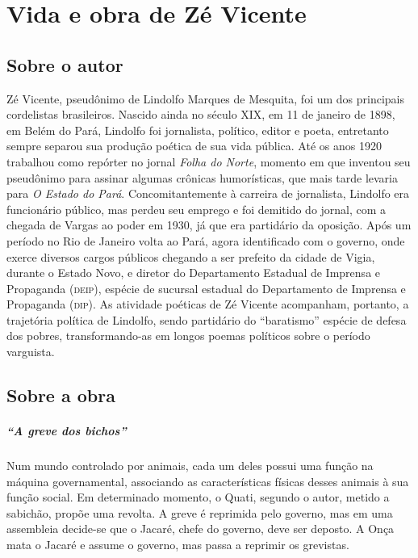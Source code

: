 \chapter{Vida e obra de Zé Vicente}

\section{Sobre o autor}

Zé Vicente, pseudônimo de Lindolfo Marques de Mesquita, foi um dos
principais cordelistas brasileiros. Nascido ainda no século XIX, em 11 de
janeiro de 1898, em Belém do Pará, Lindolfo foi jornalista, político,
editor e poeta, entretanto sempre separou sua produção poética de sua
vida pública. Até os anos 1920 trabalhou como repórter no jornal \textit{Folha
do Norte}, momento em que inventou seu pseudônimo para assinar algumas
crônicas humorísticas, que mais tarde levaria para \textit{O Estado do Pará}.
Concomitantemente à carreira de jornalista, Lindolfo era funcionário
público, mas perdeu seu emprego e foi demitido do jornal, com a chegada
de Vargas ao poder em 1930, já que era partidário da oposição. Após um
período no Rio de Janeiro volta ao Pará, agora identificado com o
governo, onde exerce diversos cargos públicos chegando a ser prefeito
da cidade de Vigia, durante o Estado Novo, e diretor do Departamento
Estadual de Imprensa e Propaganda (\textsc{deip}), espécie de sucursal estadual
do Departamento de Imprensa e Propaganda (\textsc{dip}). 
As atividade poéticas de Zé Vicente acompanham, portanto, a
trajetória política de Lindolfo, sendo partidário do
``baratismo'' espécie de defesa dos pobres, transformando-as 
em longos poemas políticos sobre o período varguista.

\section{Sobre a obra}


\paragraph{``A greve dos bichos''}

Num mundo controlado por animais, cada um deles possui uma função na
máquina governamental, associando as características físicas desses
animais à sua função social. Em determinado momento, o Quati, segundo
o autor, metido a sabichão, propõe uma revolta. A greve é reprimida
pelo governo, mas em uma assembleia decide-se que o Jacaré,
chefe do governo, deve ser deposto. A Onça mata o Jacaré e assume o
governo, mas passa a reprimir os grevistas. 


